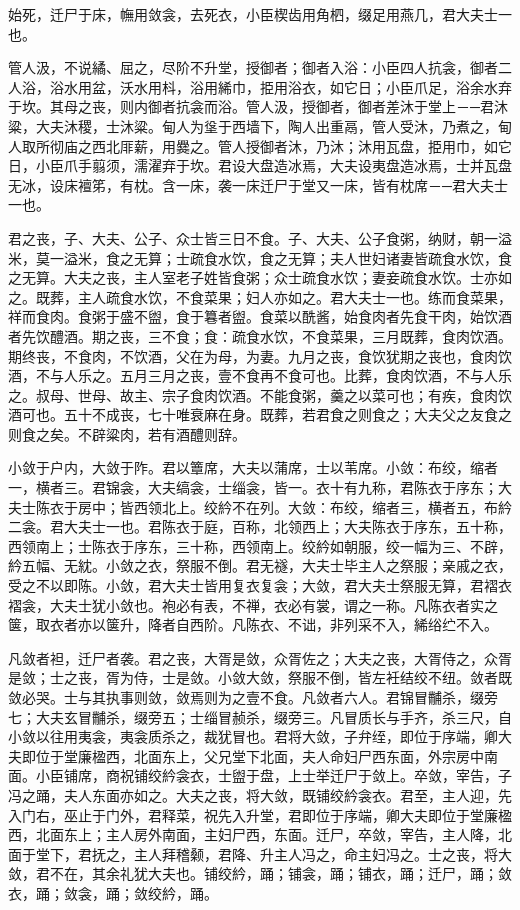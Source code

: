 \documentclass[]{article}
\begin{document}
始死，迁尸于床，幠用敛衾，去死衣，小臣楔齿用角柶，缀足用燕几，君大夫士一也。

管人汲，不说繘、屈之，尽阶不升堂，授御者；御者入浴：小臣四人抗衾，御者二人浴，浴水用盆，沃水用枓，浴用絺巾，挋用浴衣，如它日；小臣爪足，浴余水弃于坎。其母之丧，则内御者抗衾而浴。管人汲，授御者，御者差沐于堂上－─君沐粱，大夫沐稷，士沐粱。甸人为垼于西墙下，陶人出重鬲，管人受沐，乃煮之，甸人取所彻庙之西北厞薪，用爨之。管人授御者沐，乃沐；沐用瓦盘，挋用巾，如它日，小臣爪手翦须，濡濯弃于坎。君设大盘造冰焉，大夫设夷盘造冰焉，士并瓦盘无冰，设床襢笫，有枕。含一床，袭一床迁尸于堂又一床，皆有枕席－─君大夫士一也。

君之丧，子、大夫、公子、众士皆三日不食。子、大夫、公子食粥，纳财，朝一溢米，莫一溢米，食之无算；士疏食水饮，食之无算；夫人世妇诸妻皆疏食水饮，食之无算。大夫之丧，主人室老子姓皆食粥；众士疏食水饮；妻妾疏食水饮。士亦如之。既葬，主人疏食水饮，不食菜果；妇人亦如之。君大夫士一也。练而食菜果，祥而食肉。食粥于盛不盥，食于篹者盥。食菜以酰酱，始食肉者先食干肉，始饮酒者先饮醴酒。期之丧，三不食；食：疏食水饮，不食菜果，三月既葬，食肉饮酒。期终丧，不食肉，不饮酒，父在为母，为妻。九月之丧，食饮犹期之丧也，食肉饮酒，不与人乐之。五月三月之丧，壹不食再不食可也。比葬，食肉饮酒，不与人乐之。叔母、世母、故主、宗子食肉饮酒。不能食粥，羹之以菜可也；有疾，食肉饮酒可也。五十不成丧，七十唯衰麻在身。既葬，若君食之则食之；大夫父之友食之则食之矣。不辟粱肉，若有酒醴则辞。

小敛于户内，大敛于阼。君以簟席，大夫以蒲席，士以苇席。小敛：布绞，缩者一，横者三。君锦衾，大夫缟衾，士缁衾，皆一。衣十有九称，君陈衣于序东；大夫士陈衣于房中；皆西领北上。绞紟不在列。大敛：布绞，缩者三，横者五，布紟二衾。君大夫士一也。君陈衣于庭，百称，北领西上；大夫陈衣于序东，五十称，西领南上；士陈衣于序东，三十称，西领南上。绞紟如朝服，绞一幅为三、不辟，紟五幅、无紞。小敛之衣，祭服不倒。君无襚，大夫士毕主人之祭服；亲戚之衣，受之不以即陈。小敛，君大夫士皆用复衣复衾；大敛，君大夫士祭服无算，君褶衣褶衾，大夫士犹小敛也。袍必有表，不禅，衣必有裳，谓之一称。凡陈衣者实之箧，取衣者亦以箧升，降者自西阶。凡陈衣、不诎，非列采不入，絺绤纻不入。

凡敛者袒，迁尸者袭。君之丧，大胥是敛，众胥佐之；大夫之丧，大胥侍之，众胥是敛；士之丧，胥为侍，士是敛。小敛大敛，祭服不倒，皆左衽结绞不纽。敛者既敛必哭。士与其执事则敛，敛焉则为之壹不食。凡敛者六人。君锦冒黼杀，缀旁七；大夫玄冒黼杀，缀旁五；士缁冒赪杀，缀旁三。凡冒质长与手齐，杀三尺，自小敛以往用夷衾，夷衾质杀之，裁犹冒也。君将大敛，子弁绖，即位于序端，卿大夫即位于堂廉楹西，北面东上，父兄堂下北面，夫人命妇尸西东面，外宗房中南面。小臣铺席，商祝铺绞紟衾衣，士盥于盘，上士举迁尸于敛上。卒敛，宰告，子冯之踊，夫人东面亦如之。大夫之丧，将大敛，既铺绞紟衾衣。君至，主人迎，先入门右，巫止于门外，君释菜，祝先入升堂，君即位于序端，卿大夫即位于堂廉楹西，北面东上；主人房外南面，主妇尸西，东面。迁尸，卒敛，宰告，主人降，北面于堂下，君抚之，主人拜稽颡，君降、升主人冯之，命主妇冯之。士之丧，将大敛，君不在，其余礼犹大夫也。铺绞紟，踊；铺衾，踊；铺衣，踊；迁尸，踊；敛衣，踊；敛衾，踊；敛绞紟，踊。
\end{document}
